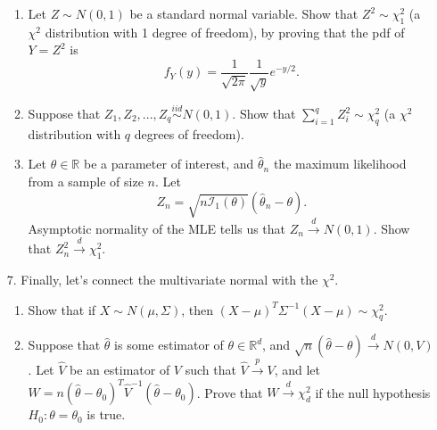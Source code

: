 \documentclass[11pt]{article}
\begin{document}
\begin{enumerate}
\begin{enumerate}
\item Let $Z \sim N(0, 1)$ be a standard normal variable. Show that $Z^2 \sim \chi^2_1$ (a $\chi^2$ distribution with 1 degree of freedom), by proving that the pdf of $Y = Z^2$ is 
$$f_{Y}(y) = \frac{1}{\sqrt{2 \pi}} \frac{1}{\sqrt{y}} e^{-y/2}.$$

\item Suppose that $Z_1, Z_2,...,Z_q \overset{iid}{\sim} N(0, 1)$. Show that $\sum \limits_{i=1}^q Z_i^2 \sim \chi^2_q$ (a $\chi^2$ distribution with $q$ degrees of freedom). 

\item Let $\theta \in \mathbb{R}$ be a parameter of interest, and $\widehat{\theta}_n$ the maximum likelihood from a sample of size $n$. Let 
$$Z_n = \sqrt{n \mathcal{I}_1(\theta)}(\widehat{\theta}_n - \theta).$$
Asymptotic normality of the MLE tells us that $Z_n \overset{d}{\to} N(0, 1)$. Show that $Z_n^2 \overset{d}{\to} \chi^2_1$.
\end{enumerate}


\item[7.] Finally, let's connect the multivariate normal with the $\chi^2$.

\begin{enumerate}


\item Show that if $X \sim N(\mu, \Sigma)$, then $(X - \mu)^T \Sigma^{-1} (X - \mu) \sim \chi^2_q$.

\item Suppose that $\widehat{\theta}$ is some estimator of $\theta \in \mathbb{R}^d$, and $\sqrt{n}(\widehat{\theta} - \theta) \overset{d}{\to} N(0, V)$. Let $\widehat{V}$ be an estimator of $V$ such that $\widehat{V} \overset{p}{\to} V$, and let $W = n(\widehat{\theta} - \theta_0)^T \widehat{V}^{-1} (\widehat{\theta} - \theta_0)$. Prove that $W \overset{d}{\to} \chi^2_d$ if the null hypothesis $H_0: \theta = \theta_0$ is true.
\end{enumerate}

\end{enumerate}
\end{document}
